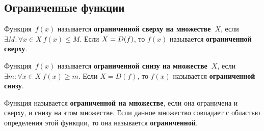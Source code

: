 \subsection{Ограниченные функции}
 Функция~$f(x)$ называется \textbf{ограниченной сверху на множестве~$X$}, если $\exists M \colon \forall x \in X \ f(x) \leqslant M$.
Если $X \opbr= D(f)$, то $f(x)$ называется \textbf{ограниченной сверху}.

Функция~$f(x)$ называется \textbf{ограниченной снизу на множестве~$X$}, если $\exists m \colon \forall x \in X \ f(x) \geqslant m$.
Если $X = D(f)$, то $f(x)$ называется \textbf{ограниченной снизу}.

Функция называется \textbf{ограниченной на множестве}, если она ограничена и сверху, и снизу на этом множестве.
Если данное множество совпадает с областью определения этой функции, то она называется \textbf{ограниченной}.